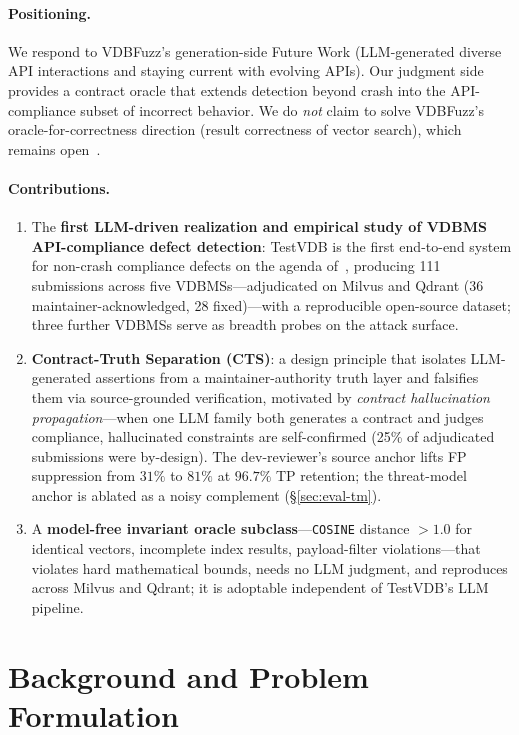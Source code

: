 \documentclass[sigconf]{acmart}
\begin{document}
\paragraph{Positioning.}
We respond to VDBFuzz's generation-side Future Work (LLM-generated diverse API interactions and staying current with evolving APIs). Our judgment side provides a contract oracle that extends detection beyond crash into the API-compliance subset of incorrect behavior. We do \emph{not} claim to solve VDBFuzz's oracle-for-correctness direction (result correctness of vector search), which remains open~\cite{roadmap25}.

\paragraph{Contributions.}
\begin{enumerate}[leftmargin=*,itemsep=2pt]
\item The \textbf{first LLM-driven realization and empirical study of VDBMS API-compliance defect detection}: TestVDB is the first end-to-end system for non-crash compliance defects on the agenda of~\cite{roadmap25}, producing 111 submissions across five VDBMSs---adjudicated on Milvus and Qdrant (36 maintainer-acknowledged, 28 fixed)---with a reproducible open-source dataset; three further VDBMSs serve as breadth probes on the attack surface.
\item \textbf{Contract-Truth Separation (CTS)}: a design principle that isolates LLM-generated assertions from a maintainer-authority truth layer and falsifies them via source-grounded verification, motivated by \emph{contract hallucination propagation}---when one LLM family both generates a contract and judges compliance, hallucinated constraints are self-confirmed (25\% of adjudicated submissions were by-design). The dev-reviewer's source anchor lifts FP suppression from $31\%$ to $81\%$ at $96.7\%$ TP retention; the threat-model anchor is ablated as a noisy complement (\S\ref{sec:eval-tm}).
\item A \textbf{model-free invariant oracle subclass}---\texttt{COSINE} distance $>1.0$ for identical vectors, incomplete index results, payload-filter violations---that violates hard mathematical bounds, needs no LLM judgment, and reproduces across Milvus and Qdrant; it is adoptable independent of TestVDB's LLM pipeline.
\end{enumerate}

\section{Background and Problem Formulation}\label{sec:bg}
\end{document}
